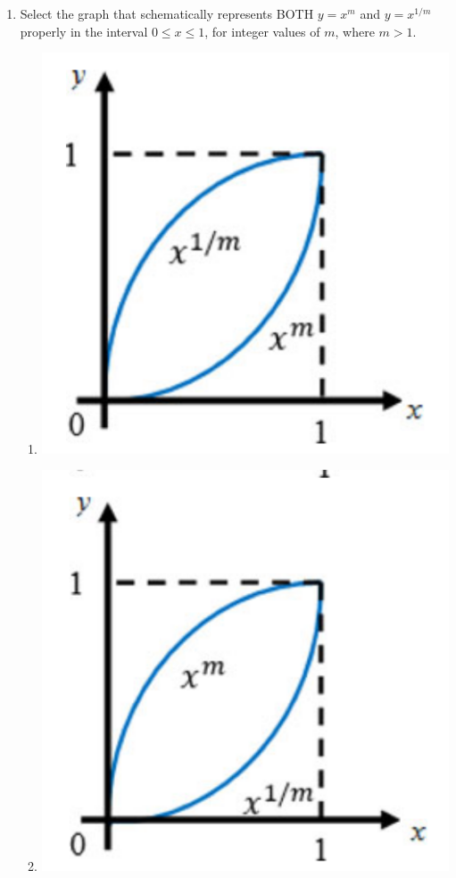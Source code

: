 \documentclass[12pt,onecolumn]{article}
\begin{document}
\begin{enumerate}
    \item Select the graph that schematically represents BOTH $y=x^m$ and $y=x^{1/m}$ properly in the interval $0\le x \le 1$, for integer values of $m$, where $m > 1$.
          \begin{enumerate}
              \item \includegraphics[scale=0.2]{o9a}
              \item \includegraphics[scale=0.2]{o9b}

\end{enumerate}
\end{enumerate}
\end{document}
